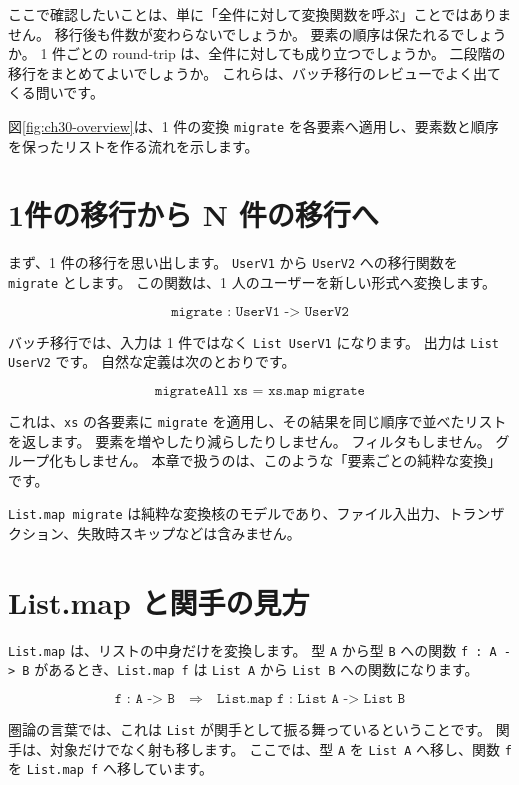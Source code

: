 ここで確認したいことは、単に「全件に対して変換関数を呼ぶ」ことではありません。
移行後も件数が変わらないでしょうか。
要素の順序は保たれるでしょうか。
1 件ごとの round-trip は、全件に対しても成り立つでしょうか。
二段階の移行をまとめてよいでしょうか。
これらは、バッチ移行のレビューでよく出てくる問いです。

図\ref{fig:ch30-overview}は、1 件の変換 \texttt{migrate} を各要素へ適用し、要素数と順序を保ったリストを作る流れを示します。


\section{1件の移行から N 件の移行へ}

まず、1 件の移行を思い出します。
\texttt{UserV1} から \texttt{UserV2} への移行関数を \texttt{migrate} とします。
この関数は、1 人のユーザーを新しい形式へ変換します。

\[
  \texttt{migrate : UserV1 -> UserV2}
\]

バッチ移行では、入力は 1 件ではなく \texttt{List UserV1} になります。
出力は \texttt{List UserV2} です。
自然な定義は次のとおりです。

\[
  \texttt{migrateAll xs = xs.map migrate}
\]

これは、\texttt{xs} の各要素に \texttt{migrate} を適用し、その結果を同じ順序で並べたリストを返します。
要素を増やしたり減らしたりしません。
フィルタもしません。
グループ化もしません。
本章で扱うのは、このような「要素ごとの純粋な変換」です。

\texttt{List.map migrate} は純粋な変換核のモデルであり、ファイル入出力、トランザクション、失敗時スキップなどは含みません。

\section{List.map と関手の見方}

\texttt{List.map} は、リストの中身だけを変換します。
型 \texttt{A} から型 \texttt{B} への関数 \texttt{f : A -> B} があるとき、\texttt{List.map f} は \texttt{List A} から \texttt{List B} への関数になります。

\[
  \texttt{f : A -> B}
  \quad\Longrightarrow\quad
  \texttt{List.map f : List A -> List B}
\]

圏論の言葉では、これは \texttt{List} が関手として振る舞っているということです。
関手は、対象だけでなく射も移します。
ここでは、型 \texttt{A} を \texttt{List A} へ移し、関数 \texttt{f} を \texttt{List.map f} へ移しています。

